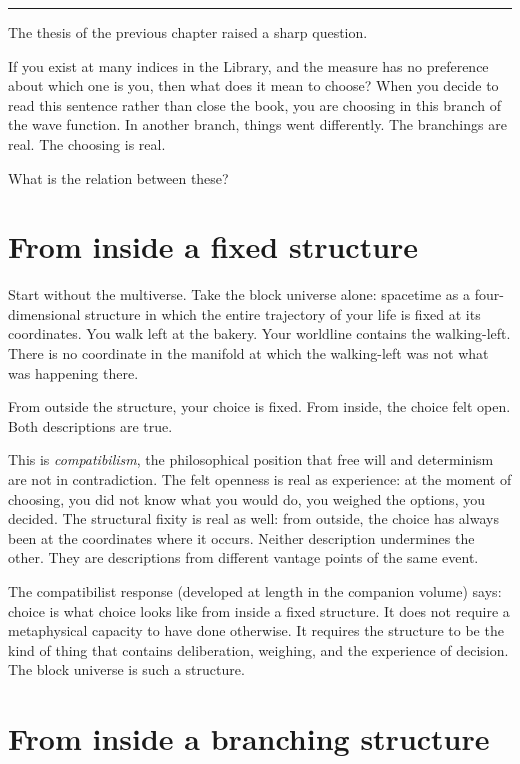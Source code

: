 \bigskip

\begin{center}\rule{0.3\textwidth}{0.4pt}\end{center}

\bigskip

\noindent The thesis of the previous chapter raised a sharp question.

If you exist at many indices in the Library, and the measure has no preference about which one is you, then what does it mean to choose? When you decide to read this sentence rather than close the book, you are choosing in this branch of the wave function. In another branch, things went differently. The branchings are real. The choosing is real.

What is the relation between these?

\section*{From inside a fixed structure}

Start without the multiverse. Take the block universe alone: spacetime as a four-dimensional structure in which the entire trajectory of your life is fixed at its coordinates. You walk left at the bakery. Your worldline contains the walking-left. There is no coordinate in the manifold at which the walking-left was not what was happening there.

From outside the structure, your choice is fixed. From inside, the choice felt open. Both descriptions are true.

This is \emph{compatibilism}, the philosophical position that free will and determinism are not in contradiction. The felt openness is real as experience: at the moment of choosing, you did not know what you would do, you weighed the options, you decided. The structural fixity is real as well: from outside, the choice has always been at the coordinates where it occurs. Neither description undermines the other. They are descriptions from different vantage points of the same event.

The compatibilist response (developed at length in the companion volume) says: choice is what choice looks like from inside a fixed structure. It does not require a metaphysical capacity to have done otherwise. It requires the structure to be the kind of thing that contains deliberation, weighing, and the experience of decision. The block universe is such a structure.

\section*{From inside a branching structure}

